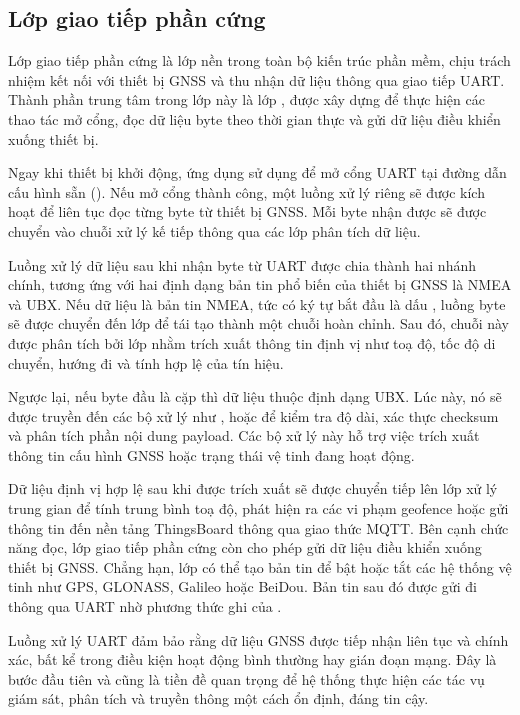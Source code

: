 \documentclass[../DoAn.tex]{subfiles}
\begin{document}
\label{subsection:4.2.1}
\subsection{Lớp giao tiếp phần cứng}
\label{subsection:4.2.2}
Lớp giao tiếp phần cứng là lớp nền trong toàn bộ kiến trúc phần mềm, chịu trách nhiệm kết nối với thiết bị GNSS và thu nhận dữ liệu thông qua giao tiếp UART. Thành phần trung tâm trong lớp này là lớp , được xây dựng để thực hiện các thao tác mở cổng, đọc dữ liệu byte theo thời gian thực và gửi dữ liệu điều khiển xuống thiết bị.

Ngay khi thiết bị khởi động, ứng dụng sử dụng  để mở cổng UART tại đường dẫn cấu hình sẵn (). Nếu mở cổng thành công, một luồng xử lý riêng sẽ được kích hoạt để liên tục đọc từng byte từ thiết bị GNSS. Mỗi byte nhận được sẽ được chuyển vào chuỗi xử lý kế tiếp thông qua các lớp phân tích dữ liệu.

Luồng xử lý dữ liệu sau khi nhận byte từ UART được chia thành hai nhánh chính, tương ứng với hai định dạng bản tin phổ biến của thiết bị GNSS là NMEA và UBX. Nếu dữ liệu là bản tin NMEA, tức có ký tự bắt đầu là dấu \text{\$}, luồng byte sẽ được chuyển đến lớp  để tái tạo thành một chuỗi hoàn chỉnh. Sau đó, chuỗi này được phân tích bởi lớp  nhằm trích xuất thông tin định vị như toạ độ, tốc độ di chuyển, hướng đi và tính hợp lệ của tín hiệu.

Ngược lại, nếu byte đầu là cặp  thì dữ liệu thuộc định dạng UBX. Lúc này, nó sẽ được truyền đến các bộ xử lý như ,  hoặc  để kiểm tra độ dài, xác thực checksum và phân tích phần nội dung payload. Các bộ xử lý này hỗ trợ việc trích xuất thông tin cấu hình GNSS hoặc trạng thái vệ tinh đang hoạt động.

Dữ liệu định vị hợp lệ sau khi được trích xuất sẽ được chuyển tiếp lên lớp xử lý trung gian để tính trung bình toạ độ, phát hiện ra các vi phạm geofence hoặc gửi thông tin đến nền tảng ThingsBoard thông qua giao thức MQTT. Bên cạnh chức năng đọc, lớp giao tiếp phần cứng còn cho phép gửi dữ liệu điều khiển xuống thiết bị GNSS. Chẳng hạn, lớp  có thể tạo bản tin  để bật hoặc tắt các hệ thống vệ tinh như GPS, GLONASS, Galileo hoặc BeiDou. Bản tin sau đó được gửi đi thông qua UART nhờ phương thức ghi của .

Luồng xử lý UART đảm bảo rằng dữ liệu GNSS được tiếp nhận liên tục và chính xác, bất kể trong điều kiện hoạt động bình thường hay gián đoạn mạng. Đây là bước đầu tiên và cũng là tiền đề quan trọng để hệ thống thực hiện các tác vụ giám sát, phân tích và truyền thông một cách ổn định, đáng tin cậy.
\end{document}
